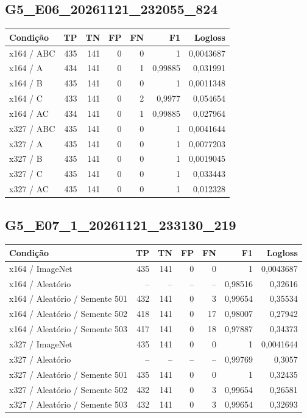 \subsection{G5\_E06\_20261121\_232055\_824}
\small\begin{longtable}{@{}p{.38\linewidth}rrrrrr@{}}
\toprule Condição & TP & TN & FP & FN & F1 & Logloss\\\midrule\endhead
x164 /\allowbreak{} ABC & 435 & 141 & 0 & 0 & 1 & 0,0043687\\
x164 /\allowbreak{} A & 434 & 141 & 0 & 1 & 0,99885 & 0,031991\\
x164 /\allowbreak{} B & 435 & 141 & 0 & 0 & 1 & 0,0011348\\
x164 /\allowbreak{} C & 433 & 141 & 0 & 2 & 0,9977 & 0,054654\\
x164 /\allowbreak{} AC & 434 & 141 & 0 & 1 & 0,99885 & 0,027964\\
x327 /\allowbreak{} ABC & 435 & 141 & 0 & 0 & 1 & 0,0041644\\
x327 /\allowbreak{} A & 435 & 141 & 0 & 0 & 1 & 0,0077203\\
x327 /\allowbreak{} B & 435 & 141 & 0 & 0 & 1 & 0,0019045\\
x327 /\allowbreak{} C & 435 & 141 & 0 & 0 & 1 & 0,033443\\
x327 /\allowbreak{} AC & 435 & 141 & 0 & 0 & 1 & 0,012328\\
\bottomrule\end{longtable}\normalsize

\subsection{G5\_E07\_1\_20261121\_233130\_219}
\small\begin{longtable}{@{}p{.38\linewidth}rrrrrr@{}}
\toprule Condição & TP & TN & FP & FN & F1 & Logloss\\\midrule\endhead
x164 /\allowbreak{} ImageNet & 435 & 141 & 0 & 0 & 1 & 0,0043687\\
x164 /\allowbreak{} Aleatório & -- & -- & -- & -- & 0,98516 & 0,32616\\
x164 /\allowbreak{} Aleatório /\allowbreak{} Semente 501 & 432 & 141 & 0 & 3 & 0,99654 & 0,35534\\
x164 /\allowbreak{} Aleatório /\allowbreak{} Semente 502 & 418 & 141 & 0 & 17 & 0,98007 & 0,27942\\
x164 /\allowbreak{} Aleatório /\allowbreak{} Semente 503 & 417 & 141 & 0 & 18 & 0,97887 & 0,34373\\
x327 /\allowbreak{} ImageNet & 435 & 141 & 0 & 0 & 1 & 0,0041644\\
x327 /\allowbreak{} Aleatório & -- & -- & -- & -- & 0,99769 & 0,3057\\
x327 /\allowbreak{} Aleatório /\allowbreak{} Semente 501 & 435 & 141 & 0 & 0 & 1 & 0,32435\\
x327 /\allowbreak{} Aleatório /\allowbreak{} Semente 502 & 432 & 141 & 0 & 3 & 0,99654 & 0,26581\\
x327 /\allowbreak{} Aleatório /\allowbreak{} Semente 503 & 432 & 141 & 0 & 3 & 0,99654 & 0,32693\\
\bottomrule\end{longtable}\normalsize

